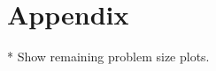 \documentclass[sigconf]{acmart}
\begin{document}

\nocite{*}



\section{Appendix}
* Show remaining problem size plots. 
\end{document}
